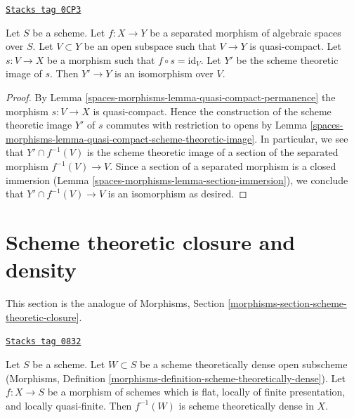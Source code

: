 \begin{lemma}
\label{spaces-morphisms-lemma-scheme-theoretic-image-of-partial-section}
\href{https://stacks.math.columbia.edu/tag/0CP3}{\texttt{Stacks tag 0CP3}}

Let $S$ be a scheme.
Let $f : X \to Y$ be a separated morphism of algebraic spaces over $S$.
Let $V \subset Y$ be an open subspace such that $V \to Y$ is quasi-compact.
Let $s : V \to X$ be a morphism such that $f \circ s = \text{id}_V$.
Let $Y'$ be the scheme theoretic image of $s$.
Then $Y' \to Y$ is an isomorphism over $V$.
\end{lemma}

\begin{proof}
By Lemma \ref{spaces-morphisms-lemma-quasi-compact-permanence}
the morphism $s : V \to X$ is quasi-compact.
Hence the construction of the scheme theoretic image $Y'$
of $s$ commutes with restriction to opens by
Lemma \ref{spaces-morphisms-lemma-quasi-compact-scheme-theoretic-image}.
In particular, we see that $Y' \cap f^{-1}(V)$ is the
scheme theoretic image of a section of the separated
morphism $f^{-1}(V) \to V$. Since a section of a separated
morphism is a closed immersion
(Lemma \ref{spaces-morphisms-lemma-section-immersion}),
we conclude that
$Y' \cap f^{-1}(V) \to V$ is an isomorphism as desired.
\end{proof}

\section{Scheme theoretic closure and density}
\label{spaces-morphisms-section-scheme-theoretic-closure}
This section is the analogue of
Morphisms, Section \ref{morphisms-section-scheme-theoretic-closure}.

\begin{lemma}
\label{spaces-morphisms-lemma-scheme-theoretically-dense-representable}
\href{https://stacks.math.columbia.edu/tag/0832}{\texttt{Stacks tag 0832}}

Let $S$ be a scheme. Let $W \subset S$ be a scheme theoretically
dense open subscheme
(Morphisms, Definition \ref{morphisms-definition-scheme-theoretically-dense}).
Let $f : X \to S$ be a morphism of schemes which is flat, locally of
finite presentation, and locally quasi-finite.
Then $f^{-1}(W)$ is scheme theoretically dense in $X$.
\end{lemma}

